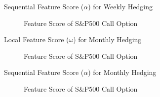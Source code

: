 \documentclass[10pt,table,mathserif]{beamer}
\begin{document}
\begin{frame}[fragile]{Sequential Feature Score ($\alpha$) for Weekly Hedging}
\begin{figure}[htp]
  \centering
  \caption{Feature Score of S\&P500 Call Option} \label{fig:call1}
\end{figure}
\end{frame}



\begin{frame}[fragile]{Local Feature Score ($\omega$) for Monthly Hedging}
\begin{figure}[htp]
  \centering
  \caption{Feature Score of S\&P500 Call Option} \label{fig:call1}
\end{figure}
\end{frame}


\begin{frame}[fragile]{Sequential Feature Score ($\alpha$) for Monthly Hedging}
\begin{figure}[htp]
  \centering
  \caption{Feature Score of S\&P500 Call Option} \label{fig:call1}
\end{figure}
\end{frame}
\end{document}
